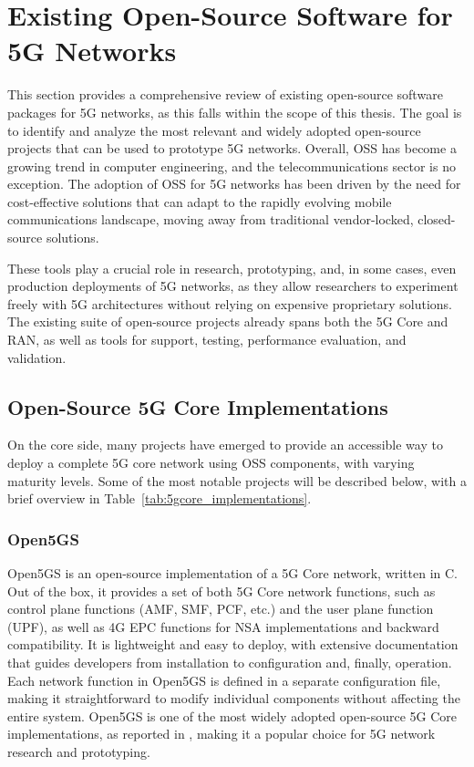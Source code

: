 \section{Existing Open-Source Software for 5G Networks}
\label{sec:existing_5g_packages}

This section provides a comprehensive review of existing open-source software packages for 5G networks, as this falls within the scope of this thesis. The goal is to identify and analyze the most relevant and widely adopted open-source projects that can be used to prototype 5G networks. Overall, \gls{OSS} has become a growing trend in computer engineering, and the telecommunications sector is no exception. The adoption of \gls{OSS} for 5G networks has been driven by the need for cost-effective solutions that can adapt to the rapidly evolving mobile communications landscape, moving away from traditional vendor-locked, closed-source solutions.

These tools play a crucial role in research, prototyping, and, in some cases, even production deployments of 5G networks, as they allow researchers to experiment freely with 5G architectures without relying on expensive proprietary solutions. The existing suite of open-source projects already spans both the 5G Core and \gls{RAN}, as well as tools for support, testing, performance evaluation, and validation.

\subsection{Open-Source 5G Core Implementations}
\label{sec:open_source_5g_core_implementations}%
On the core side, many projects have emerged to provide an accessible way to deploy a complete 5G core network using \gls{OSS} components, with varying maturity levels. Some of the most notable projects will be described below, with a brief overview in Table~\ref{tab:5gcore_implementations}.

\subsubsection{Open5GS}
Open5GS \cite{open5gs_repo} is an open-source implementation of a 5G Core network, written in C. Out of the box, it provides a set of both 5G Core network functions, such as control plane functions (\gls{AMF}, \gls{SMF}, \gls{PCF}, etc.) and the user plane function (\gls{UPF}), as well as 4G \gls{EPC} functions for \gls{NSA} implementations and backward compatibility. It is lightweight and easy to deploy, with extensive documentation that guides developers from installation to configuration and, finally, operation. Each network function in Open5GS is defined in a separate configuration file, making it straightforward to modify individual components without affecting the entire system.
Open5GS is one of the most widely adopted open-source 5G Core implementations, as reported in \cites{bonati2025_5gct}{horstmann2025open5gcube}{mamushiane2023deploying}{tio2025exploring5g}, making it a popular choice for 5G network research and prototyping.


